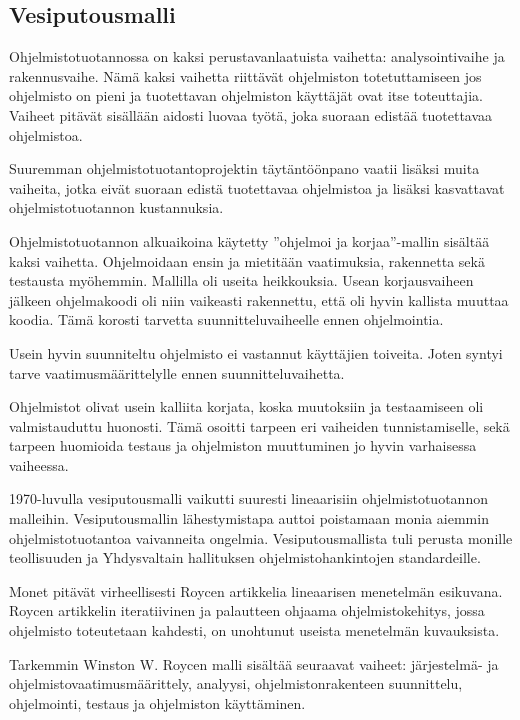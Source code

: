 \documentclass[finnish]{tktltiki2}
\theoremstyle{definition}
\theoremstyle{remark}
\begin{document}
\subsection{Vesiputousmalli}

Ohjelmistotuotannossa on kaksi perustavanlaatuista vaihetta: analysointivaihe ja rakennusvaihe. Nämä kaksi vaihetta riittävät ohjelmiston totetuttamiseen jos ohjelmisto on pieni ja tuotettavan ohjelmiston käyttäjät ovat itse toteuttajia. Vaiheet pitävät sisällään aidosti luovaa työtä, joka suoraan edistää tuotettavaa ohjelmistoa\cite{ROY70}.

Suuremman ohjelmistotuotantoprojektin täytäntöönpano vaatii lisäksi muita vaiheita, jotka eivät suoraan edistä tuotettavaa ohjelmistoa ja lisäksi kasvattavat ohjelmistotuotannon kustannuksia\cite{ROY70}.

Ohjelmistotuotannon alkuaikoina käytetty ''ohjelmoi ja korjaa''-mallin sisältää kaksi vaihetta. Ohjelmoidaan ensin ja mietitään vaatimuksia, rakennetta sekä testausta myöhemmin. Mallilla oli useita heikkouksia. Usean korjausvaiheen jälkeen ohjelmakoodi oli niin vaikeasti rakennettu, että oli hyvin kallista muuttaa koodia. Tämä korosti tarvetta suunnitteluvaiheelle ennen ohjelmointia\cite{BOE88}.

Usein hyvin suunniteltu ohjelmisto ei vastannut käyttäjien toiveita. Joten syntyi tarve vaatimusmäärittelylle ennen suunnitteluvaihetta\cite{BOE88}. 

Ohjelmistot olivat usein kalliita korjata, koska muutoksiin ja testaamiseen oli valmistauduttu huonosti. Tämä osoitti tarpeen eri vaiheiden tunnistamiselle, sekä tarpeen huomioida testaus ja ohjelmiston muuttuminen jo hyvin varhaisessa vaiheessa\cite{BOE88}. 

1970-luvulla vesiputousmalli vaikutti suuresti lineaarisiin ohjelmistotuotannon malleihin. Vesiputousmallin lähestymistapa auttoi poistamaan monia aiemmin ohjelmistotuotantoa vaivanneita ongelmia. Vesiputousmallista tuli perusta monille teollisuuden ja Yhdysvaltain hallituksen ohjelmistohankintojen standardeille\cite{BOE88}.

Monet pitävät virheellisesti Roycen artikkelia lineaarisen menetelmän esikuvana. Roycen artikkelin iteratiivinen ja palautteen ohjaama ohjelmistokehitys, jossa ohjelmisto toteutetaan kahdesti, on unohtunut useista menetelmän kuvauksista\cite{LAB03}.

Tarkemmin Winston W. Roycen malli sisältää seuraavat vaiheet: järjestelmä- ja ohjelmistovaatimusmäärittely, analyysi, ohjelmistonrakenteen suunnittelu, ohjelmointi, testaus ja ohjelmiston käyttäminen\cite{ROY70}. 
\end{document}
